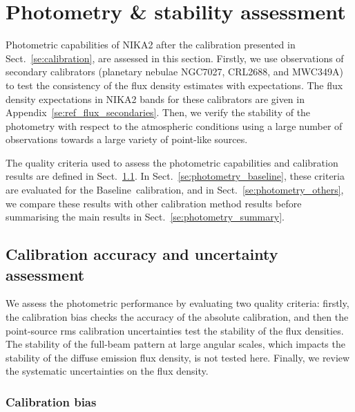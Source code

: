 \documentclass[traditionalabstract]{aa}
\newcommand{\baseline}{Baseline}%
\newcommand{\lp}[1]{#1}
\newcommand{\rev}[1]{#1}
\begin{document}
{%
\section{Photometry \& stability assessment}
\label{se:photometry}
%

Photometric capabilities of NIKA2 after the calibration presented in
Sect.~\ref{se:calibration}, are assessed in this section. Firstly,
we use observations of secondary calibrators (planetary nebulae NGC7027, CRL2688, and
MWC349A) to test the consistency of the flux density estimates with
expectations. The flux density expectations
in NIKA2 bands for these calibrators are given in
Appendix~\ref{se:ref_flux_secondaries}. Then,
we verify the stability of the photometry with
respect to the atmospheric conditions using a large number of
observations towards a large variety of {\rev point-like}
sources. 

The quality criteria used to assess the photometric capabilities and
calibration results are defined in Sect.~\ref{se:photometry_criteria}.
In Sect.~\ref{se:photometry_baseline}, these criteria are evaluated
for the \baseline\ calibration, and in Sect.~\ref{se:photometry_others},
we compare these results with other calibration method results before
summarising the main results in Sect.~\ref{se:photometry_summary}. 


\subsection{Calibration accuracy and uncertainty assessment}
\label{se:photometry_criteria}

We assess the photometric performance by evaluating two
quality criteria: firstly, the calibration bias checks the accuracy of
the absolute calibration, and then the {\rev point-source} rms
calibration uncertainties test the stability of the flux
densities. {\rev The stability of the full-beam pattern at large
angular scales, which impacts the stability of the diffuse emission
flux density, is not tested here}. {\lp Finally, we review the
systematic uncertainties on the flux density.}


\subsubsection{Calibration bias}
\label{se:def_calibration_bias}

}
\end{document}
